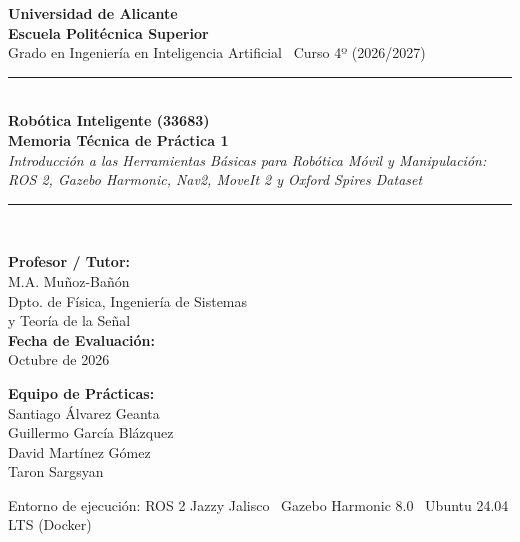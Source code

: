 \documentclass[11pt,a4paper]{article}
\begin{document}
\hypersetup{pageanchor=false}
\begin{titlepage}
    \centering
    \vspace*{1.0cm}
    {\Huge\bfseries\color{uaBlue} Universidad de Alicante}\\[0.3cm]
    {\LARGE\bfseries\color{uaDarkSlate} Escuela Politécnica Superior}\\[0.2cm]
    {\large Grado en Ingeniería en Inteligencia Artificial \textbar\ Curso 4º (2026/2027)}\\[1.8cm]

    \rule{\linewidth}{1.5pt}\\[0.4cm]
    {\huge\bfseries\color{uaBlue} Robótica Inteligente (33683)}\\[0.3cm]
    {\Large\bfseries Memoria Técnica de Práctica 1}\\[0.2cm]
    {\large\itshape Introducción a las Herramientas Básicas para Robótica Móvil y Manipulación:\\
    ROS 2, Gazebo Harmonic, Nav2, MoveIt 2 y Oxford Spires Dataset}\\[0.3cm]
    \rule{\linewidth}{1.5pt}\\[1.4cm]

    \begin{minipage}{0.48\textwidth}
        \begin{flushleft}
            \textbf{\color{uaBlue} Profesor / Tutor:}\\[0.15cm]
            M.A. Muñoz-Bañón\\
            \small Dpto. de Física, Ingeniería de Sistemas\\
            y Teoría de la Señal\\[0.6cm]
            \textbf{\color{uaBlue} Fecha de Evaluación:}\\[0.15cm]
            Octubre de 2026
        \end{flushleft}
    \end{minipage}
    \hfill
    \begin{minipage}{0.48\textwidth}
        \begin{flushright}
            \textbf{\color{uaBlue} Equipo de Prácticas:}\\[0.15cm]
            Santiago Álvarez Geanta\\
            Guillermo García Blázquez\\
            David Martínez Gómez\\
            Taron Sargsyan
        \end{flushright}
    \end{minipage}

    \vfill
    {\small Entorno de ejecución: ROS 2 Jazzy Jalisco \textbar\ Gazebo Harmonic 8.0 \textbar\ Ubuntu 24.04 LTS (Docker)}
\end{titlepage}
\hypersetup{pageanchor=true}
\end{document}
